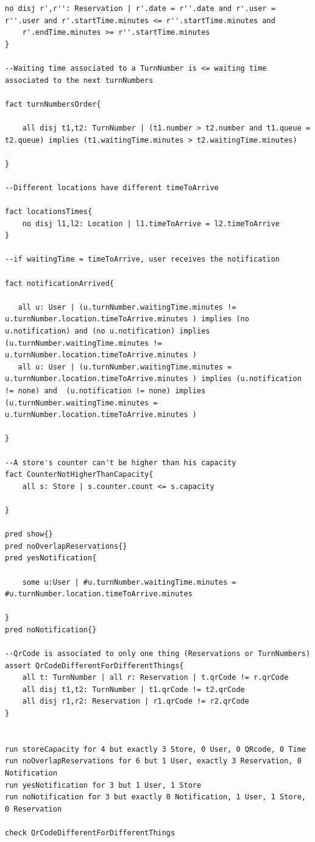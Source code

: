 \documentclass{article}
\begin{document}
\begin{lstlisting}[language=alloy]
	no disj r',r'': Reservation | r'.date = r''.date and r'.user = r''.user and r'.startTime.minutes <= r''.startTime.minutes and
    r'.endTime.minutes >= r''.startTime.minutes
}

--Waiting time associated to a TurnNumber is <= waiting time associated to the next turnNumbers

fact turnNumbersOrder{
	
	all disj t1,t2: TurnNumber | (t1.number > t2.number and t1.queue = t2.queue) implies (t1.waitingTime.minutes > t2.waitingTime.minutes)

}

--Different locations have different timeToArrive

fact locationsTimes{
	no disj l1,l2: Location | l1.timeToArrive = l2.timeToArrive
}

--if waitingTime = timeToArrive, user receives the notification

fact notificationArrived{

   all u: User | (u.turnNumber.waitingTime.minutes != u.turnNumber.location.timeToArrive.minutes ) implies (no u.notification) and (no u.notification) implies (u.turnNumber.waitingTime.minutes != u.turnNumber.location.timeToArrive.minutes ) 
   all u: User | (u.turnNumber.waitingTime.minutes = u.turnNumber.location.timeToArrive.minutes ) implies (u.notification != none) and 	(u.notification != none) implies (u.turnNumber.waitingTime.minutes = u.turnNumber.location.timeToArrive.minutes )
       
}

--A store's counter can't be higher than his capacity
fact CounterNotHigherThanCapacity{
	all s: Store | s.counter.count <= s.capacity

}

pred show{}
pred noOverlapReservations{}
pred yesNotification{
	
	some u:User | #u.turnNumber.waitingTime.minutes = #u.turnNumber.location.timeToArrive.minutes

}
pred noNotification{}

--QrCode is associated to only one thing (Reservations or TurnNumbers)
assert QrCodeDifferentForDifferentThings{
	all t: TurnNumber | all r: Reservation | t.qrCode != r.qrCode
    all disj t1,t2: TurnNumber | t1.qrCode != t2.qrCode
    all disj r1,r2: Reservation | r1.qrCode != r2.qrCode
}


run storeCapacity for 4 but exactly 3 Store, 0 User, 0 QRcode, 0 Time
run noOverlapReservations for 6 but 1 User, exactly 3 Reservation, 0 Notification
run yesNotification for 3 but 1 User, 1 Store
run noNotification for 3 but exactly 0 Notification, 1 User, 1 Store, 0 Reservation

check QrCodeDifferentForDifferentThings

\end{lstlisting}
\end{document}
